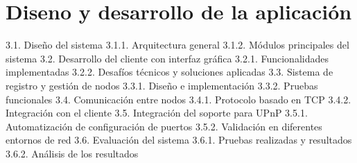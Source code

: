 \chapter{Diseno y desarrollo de la aplicaci\'on}
\label{cap:descripcionTrabajo}

3.1. Diseño del sistema
3.1.1. Arquitectura general
3.1.2. Módulos principales del sistema
3.2. Desarrollo del cliente con interfaz gráfica
3.2.1. Funcionalidades implementadas
3.2.2. Desafíos técnicos y soluciones aplicadas
3.3. Sistema de registro y gestión de nodos
3.3.1. Diseño e implementación
3.3.2. Pruebas funcionales
3.4. Comunicación entre nodos
3.4.1. Protocolo basado en TCP
3.4.2. Integración con el cliente
3.5. Integración del soporte para UPnP
3.5.1. Automatización de configuración de puertos
3.5.2. Validación en diferentes entornos de red
3.6. Evaluación del sistema
3.6.1. Pruebas realizadas y resultados
3.6.2. Análisis de los resultados
